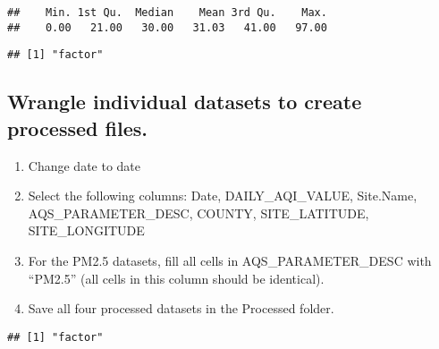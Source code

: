 \documentclass[]{article}
\newenvironment{Shaded}{\begin{snugshade}}{\end{snugshade}}
\newcommand{\KeywordTok}[1]{\textcolor[rgb]{0.13,0.29,0.53}{\textbf{#1}}}
\newcommand{\CommentTok}[1]{\textcolor[rgb]{0.56,0.35,0.01}{\textit{#1}}}
\newcommand{\OperatorTok}[1]{\textcolor[rgb]{0.81,0.36,0.00}{\textbf{#1}}}
\newcommand{\NormalTok}[1]{#1}
\providecommand{\tightlist}{%
  \setlength{\itemsep}{0pt}\setlength{\parskip}{0pt}}
\begin{document}
\begin{verbatim}
##    Min. 1st Qu.  Median    Mean 3rd Qu.    Max. 
##    0.00   21.00   30.00   31.03   41.00   97.00
\end{verbatim}

\begin{Shaded}
\end{Shaded}

\begin{verbatim}
## [1] "factor"
\end{verbatim}

\subsection{Wrangle individual datasets to create processed
files.}\label{wrangle-individual-datasets-to-create-processed-files.}

\begin{enumerate}
\def\labelenumi{\arabic{enumi}.}
\setcounter{enumi}{2}
\tightlist
\item
  Change date to date
\item
  Select the following columns: Date, DAILY\_AQI\_VALUE, Site.Name,
  AQS\_PARAMETER\_DESC, COUNTY, SITE\_LATITUDE, SITE\_LONGITUDE
\item
  For the PM2.5 datasets, fill all cells in AQS\_PARAMETER\_DESC with
  ``PM2.5'' (all cells in this column should be identical).
\item
  Save all four processed datasets in the Processed folder.
\end{enumerate}

\begin{Shaded}
\end{Shaded}

\begin{verbatim}
## [1] "factor"
\end{verbatim}

\begin{Shaded}
\end{Shaded}
\end{document}
